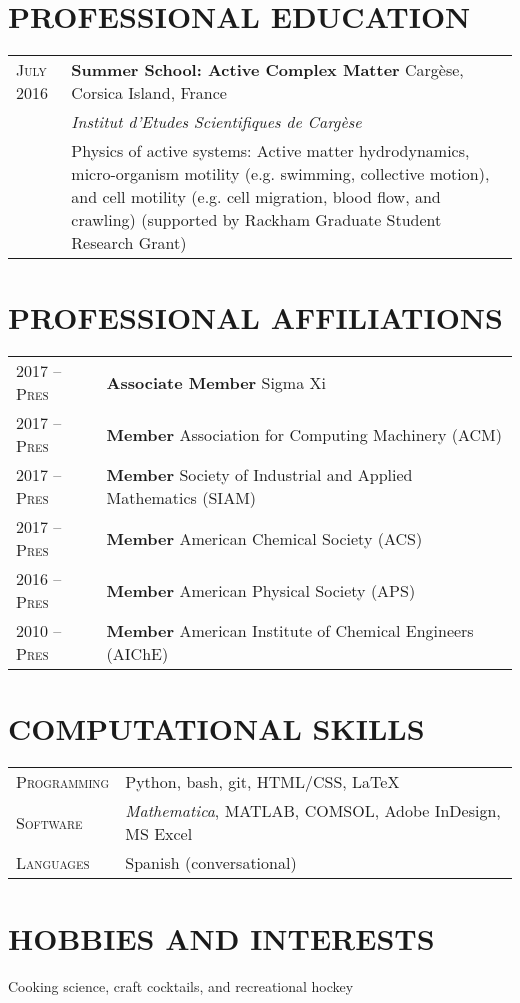 \documentclass[11pt]{article}
\begin{document}
\section{PROFESSIONAL EDUCATION}
\begin{longtable}{R{2.2cm} L{14.8cm}}
\textsc{\footnotesize July} 2016  & \textbf{Summer School: Active Complex Matter} \hfill Carg\`{e}se, Corsica Island, France \\
& \textit{Institut d'Etudes Scientifiques de Carg\`{e}se} \\
& Physics of active systems: Active matter hydrodynamics, micro-organism motility (e.g. swimming, collective motion), and cell motility (e.g. cell migration, blood flow, and crawling) (supported by Rackham Graduate Student Research Grant)
\end{longtable}



\section{PROFESSIONAL AFFILIATIONS}
\begin{longtable}{R{2.2cm} L{14.8cm}}
2017 -- \textsc{\footnotesize Pres}  & \textbf{Associate Member} Sigma Xi \\
2017 -- \textsc{\footnotesize Pres}  & \textbf{Member} Association for Computing Machinery (ACM) \\
2017 -- \textsc{\footnotesize Pres}  & \textbf{Member} Society of Industrial and Applied Mathematics (SIAM) \\
2017 -- \textsc{\footnotesize Pres}  & \textbf{Member} American Chemical Society (ACS) \\
2016 -- \textsc{\footnotesize Pres}  & \textbf{Member} American Physical Society (APS) \\
2010 -- \textsc{\footnotesize Pres}  & \textbf{Member} American Institute of Chemical Engineers (AIChE) \\
\end{longtable}



\section{COMPUTATIONAL SKILLS}
\begin{longtable}{R{2.2cm} L{14.8cm}}
\textsc{\footnotesize Programming} & Python, bash, git, HTML/CSS, \LaTeX \\
\textsc{\footnotesize Software} & \textit{Mathematica}, MATLAB, COMSOL, Adobe InDesign, MS Excel \\
\textsc{\footnotesize Languages} & Spanish (conversational)
\end{longtable}

\section{HOBBIES AND INTERESTS}
Cooking science, craft cocktails, and recreational hockey
\end{document}
